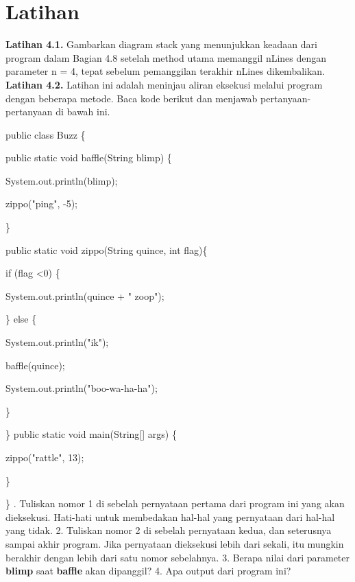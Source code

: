 \section{Latihan}
\textbf{Latihan 4.1.} Gambarkan diagram stack yang menunjukkan keadaan dari program dalam Bagian 4.8 setelah method utama memanggil nLines dengan parameter n = 4, tepat sebelum pemanggilan terakhir nLines dikembalikan.
\newline
\textbf{Latihan 4.2.} Latihan ini adalah meninjau aliran eksekusi melalui program dengan beberapa metode. Baca kode berikut dan menjawab pertanyaan-pertanyaan di bawah ini.
\par
public class Buzz \{
	\par
	public static void baffle(String blimp) \{
		\par
		System.out.println(blimp);
		\par
		zippo("ping", -5);
		\par
	\}
	\newline
	\par
	public static void zippo(String quince, int flag)\{
		\par
		if (flag \textless 0) \{
			\par
			System.out.println(quince + " zoop");
			\par
		\} else \{
		\par
		System.out.println("ik");
		\par
		baffle(quince);
		\par
		System.out.println("boo-wa-ha-ha");
		\par
	\}
			\par
\}
\newline
\newline
public static void main(String[] args) \{
	\par
	zippo("rattle", 13);
	\par
\}
\par
\}
\newline
{}. Tuliskan nomor 1 di sebelah pernyataan pertama dari program ini yang akan dieksekusi. Hati-hati untuk membedakan hal-hal yang pernyataan dari hal-hal yang tidak.
2. Tuliskan nomor 2 di sebelah pernyataan kedua, dan seterusnya sampai akhir program. Jika pernyataan dieksekusi lebih dari sekali, itu mungkin berakhir dengan lebih dari satu nomor sebelahnya.
3. Berapa nilai dari parameter \textbf{blimp} saat \textbf{baffle} akan dipanggil?
4. Apa output dari program ini?
\newline
\newline

